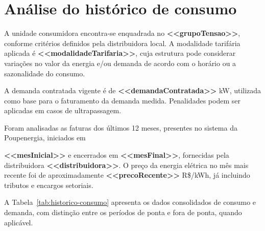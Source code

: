 \chapter{Análise do histórico de consumo}

A unidade consumidora encontra-se enquadrada no \textbf{<<grupoTensao>>}, conforme critérios definidos pela distribuidora local. A modalidade tarifária aplicada é \textbf{<<modalidadeTarifaria>>}, cuja estrutura pode considerar variações no valor da energia e/ou demanda de acordo com o horário ou a sazonalidade do consumo.

A demanda contratada vigente é de \textbf{<<demandaContratada>>} kW, utilizada como base para o faturamento da demanda medida. Penalidades podem ser aplicadas em casos de ultrapassagem.

Foram analisadas as faturas dos últimos 12 meses, presentes no sistema da Poupenergia, iniciados em {\textbf{<<mesInicial>>} e encerrados em \textbf{<<mesFinal>>}, fornecidas pela distribuidora \textbf{<<distribuidora>>}. O preço da energia elétrica no mês mais recente foi de aproximadamente \textbf{<<precoRecente>>} R\$/kWh, já incluindo tributos e encargos setoriais.

A Tabela~\ref{tab:historico-consumo} apresenta os dados consolidados de consumo e demanda, com distinção entre os períodos de ponta e fora de ponta, quando aplicável.



\vspace{1cm}


}
